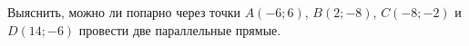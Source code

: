\begin{ex}
	\begin{condition}
		Выяснить, можно ли попарно через точки \( A(-6;6) \), \( B(2;-8) \), \( C(-8;-2) \) и \( D(14;-6) \) провести две параллельные прямые.
	\end{condition}
\end{ex}